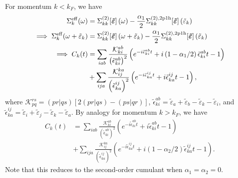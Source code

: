 \documentclass[%
 reprint,
 amsmath,amssymb,
 aps,
]{revtex4-2}
\begin{document}
For momentum $k<k_F$, we have
\begin{align}
  \Sigma^{\mathrm{eff}}_{k}(\omega) 
&= \Sigma_{kk}^{(2)}\!\left[ \bm{\tilde{\varepsilon}} \right](\omega) - \frac{\alpha_1}{2} \Sigma_{kk}^{(2),\rm{2p1h}}\!\left[ \bm{\tilde{\varepsilon}} \right](\tilde{\varepsilon}_k)\\
\implies \Sigma^{\mathrm{eff}}_{k}(\omega + \tilde{\varepsilon}_k)  &=
  \Sigma_{kk}^{(2)}\!\left[ \bm{\tilde{\varepsilon}} \right](\omega + \tilde{\varepsilon}_k) - \frac{\alpha_1}{2} \Sigma_{kk}^{(2),\rm 2p1h}\!\left[ \bm{\tilde{\varepsilon}} \right](\tilde{\varepsilon}_k)\\
\implies C_{k}(t) &= \sum_{iab} \frac{\mathcal{K}_{ki}^{ab} }{\left(\tilde{\epsilon}_{k i}^{a b}\right)^2}\left(e^{-i \tilde{\epsilon}_{k i}^{a b} t} +i \left( 1-\alpha_1 /2\right) \tilde{\epsilon}_{k i}^{a b} t -1 \right) \nonumber\\&+\sum_{ija} \frac{\mathcal{K}_{ij}^{ka}}{\left(\tilde{\epsilon}_{k a}^{i j}\right)^2} \left(e^{-i \tilde{\epsilon}_{k a}^{i j} t} +i \tilde{\epsilon}_{k a}^{i j} t -1 \right),
\end{align}
where $\mathcal{K}_{pq}^{rs} = (pr|qs) \left[ 2(pr|qs)-(ps|qr) \right]$,
$\tilde{\epsilon}_{ki}^{ab} = \tilde{\varepsilon}_a + \tilde{\varepsilon}_b - \tilde{\varepsilon}_k - \tilde{\varepsilon}_i$, and $\tilde{\epsilon}_{ka}^{ij} = \tilde{\varepsilon}_i + \tilde{\varepsilon}_j - \tilde{\varepsilon}_k - \tilde{\varepsilon}_a$. By analogy for momentum $k>k_F$, we have
\begin{align}
  C_{k}(t) &= \sum_{iab} \frac{\mathcal{K}_{ki}^{ab} }{\left(\tilde{\epsilon}_{k i}^{a b}\right)^2}\left(e^{-i \tilde{\epsilon}_{k i}^{a b} t} +i \tilde{\epsilon}_{k i}^{a b} t -1 \right) \nonumber\\&+\sum_{ija} \frac{\mathcal{K}_{ij}^{ka}}{\left(\tilde{\epsilon}_{k a}^{i j}\right)^2} \left(e^{-i \tilde{\epsilon}_{k a}^{i j} t} +i \left( 1-\alpha_2 /2\right) \tilde{\epsilon}_{k a}^{i j} t -1 \right).
\end{align}
Note that this reduces to the second-order cumulant when $\alpha_1 = \alpha_2 = 0$.
\end{document}
